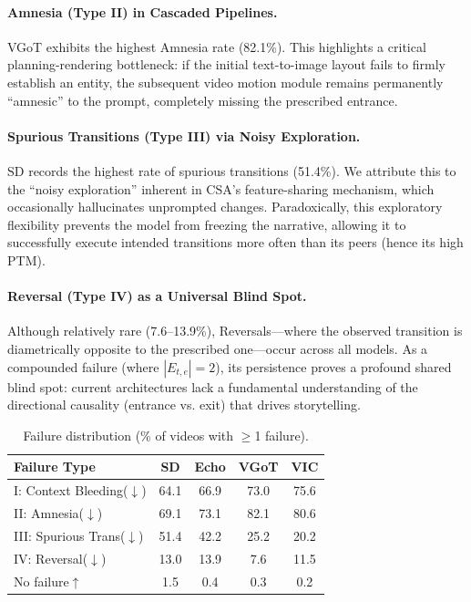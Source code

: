 \documentclass[sigconf,review,anonymous]{acmart}
\theoremstyle{definition}
\begin{document}
\paragraph{Amnesia (Type II) in Cascaded Pipelines.}
VGoT exhibits the highest Amnesia rate (82.1\%). This highlights a critical planning-rendering bottleneck: if the initial text-to-image layout fails to firmly establish an entity, the subsequent video motion module remains permanently ``amnesic'' to the prompt, completely missing the prescribed entrance.

\paragraph{Spurious Transitions (Type III) via Noisy Exploration.}
SD records the highest rate of spurious transitions (51.4\%). We attribute this to the ``noisy exploration'' inherent in CSA's feature-sharing mechanism, which occasionally hallucinates unprompted changes. Paradoxically, this exploratory flexibility prevents the model from freezing the narrative, allowing it to successfully execute intended transitions more often than its peers (hence its high PTM).

\paragraph{Reversal (Type IV) as a Universal Blind Spot.}
Although relatively rare (7.6--13.9\%), Reversals---where the observed transition is diametrically opposite to the prescribed one---occur across all models. As a compounded failure (where $|E_{t,e}| = 2$), its persistence proves a profound shared blind spot: current architectures lack a fundamental understanding of the directional causality (entrance vs. exit) that drives storytelling.

\begin{table}[t]
\caption{Failure distribution (\% of videos with $\geq$1 failure).}
\label{tab:failures}
\centering
\small
\begin{tabular}{@{}lcccc@{}}
\toprule
Failure Type & SD & Echo & VGoT & VIC \\
\midrule
I: Context Bleeding($\downarrow$)  & 64.1 & 66.9 & 73.0 & 75.6 \\
II: Amnesia($\downarrow$)           & 69.1 & 73.1 & 82.1 & 80.6 \\
III: Spurious Trans($\downarrow$)  & 51.4 & 42.2 & 25.2 & 20.2 \\
IV: Reversal($\downarrow$)          & 13.0 & 13.9 & 7.6 & 11.5 \\
\midrule
No failure$\uparrow$            & 1.5 & 0.4 & 0.3 & 0.2 \\
\bottomrule
\end{tabular}
\end{table}
\end{document}
